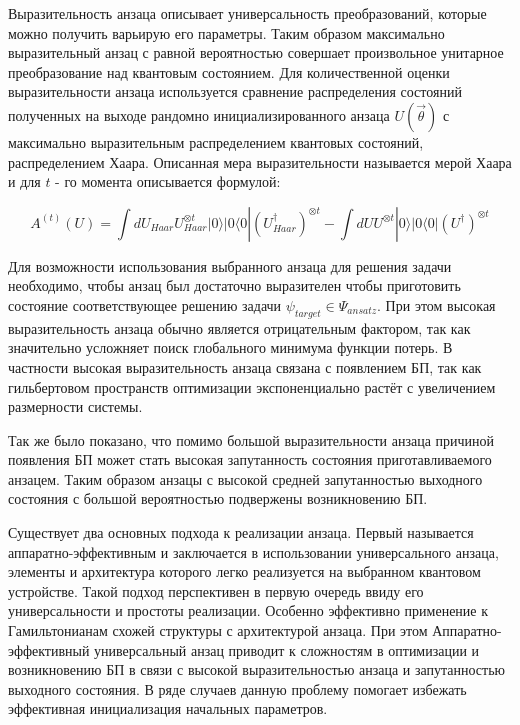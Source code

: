 \documentclass[12pt]{extarticle}
\begin{document}
\qquad Выразительность анзаца описывает универсальность преобразований, которые можно получить варьирую его параметры. Таким образом максимально выразительный анзац с равной вероятностью совершает произвольное унитарное преобразование над квантовым состоянием. Для количественной оценки выразительности анзаца используется сравнение распределения состояний полученных на выходе рандомно инициализированного анзаца $U(\vec \theta)$ с максимально выразительным распределением квантовых состояний, распределением Хаара. Описанная мера выразительности называется мерой Хаара и для $t$ - го момента описывается формулой:

\begin{equation}
A^{(t)}(U) = \int dU_{Haar}U^{\otimes t}_{Haar} |0 \rangle |0 \langle 0 | {(U^{\dagger}_{Haar})}^{\otimes t} - \int dU U^{\otimes t} |0 \rangle |0 \langle 0 | {(U^{\dagger})}^{\otimes t}
\end{equation}

\qquad Для возможности использования выбранного анзаца для решения задачи необходимо, чтобы анзац был достаточно выразителен чтобы приготовить состояние соответствующее решению задачи $\psi_{target} \in \Psi_{ansatz} $. При этом высокая выразительность анзаца обычно является отрицательным фактором, так как значительно усложняет поиск глобального минимума функции потерь. В частности высокая выразительность анзаца связана с появлением БП, так как гильбертовом пространств оптимизации  экспоненциально растёт с увеличением размерности системы.

\qquad Так же было показано, что помимо большой выразительности анзаца причиной появления БП может стать высокая запутанность состояния приготавливаемого анзацем. Таким образом анзацы с высокой средней запутанностью выходного состояния с большой вероятностью подвержены возникновению БП.

\qquad Существует два основных подхода к реализации анзаца. Первый называется аппаратно-эффективным и заключается в использовании универсального анзаца, элементы и архитектура которого легко реализуется на выбранном квантовом устройстве. Такой подход перспективен в первую очередь ввиду его универсальности и простоты реализации. Особенно эффективно применение к Гамильтонианам схожей структуры с архитектурой анзаца. При этом Аппаратно-эффективный универсальный анзац приводит к сложностям в оптимизации и возникновению БП в связи с высокой выразительностью анзаца и запутанностью выходного состояния. В ряде случаев данную проблему помогает избежать эффективная инициализация начальных параметров.
\end{document}
